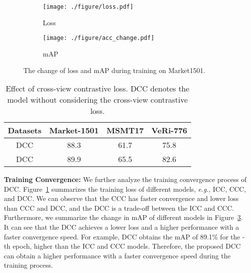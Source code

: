 \documentclass[10pt,twocolumn,letterpaper]{article}
\begin{document}
\begin{figure}
\centering
\begin{subfigure}{0.475\linewidth}
\texttt{[image: ./figure/loss.pdf]}
\caption{Loss}
\label{fig:loss}
\end{subfigure}
\begin{subfigure}{0.475\linewidth}
\texttt{[image: ./figure/acc\_change.pdf]}
\caption{mAP}
\label{fig:map}
\end{subfigure}
\caption{The change of loss and mAP during training on Market1501.}
\end{figure}

\begin{table}
\footnotesize
\begin{center}
\begin{tabular}{c|ccc}
\toprule
Datasets          & Market-1501& MSMT17 & VeRi-776\\
\midrule
DCC& 88.3 & 61.7 & 75.8\\
DCC &89.9&65.5&82.6\\ \bottomrule
\end{tabular}
\caption{\small Effect of cross-view contrastive loss. DCC denotes the model without considering the cross-view contrastive loss.}
\label{tab:effect_cvl}
\end{center}
\end{table}

\textbf{Training Convergence:}
We further analyze the training convergence process of DCC.
Figure~\ref{fig:loss} summarizes the training loss of different models, \emph{e.g.,} ICC, CCC, and DCC.
We can observe that the CCC has faster convergence and lower loss than CCC and DCC, and the DCC is a trade-off between the ICC and CCC. 
Furthermore, we summarize the change in mAP of different models in Figure~\ref{fig:map}.
It can see that the DCC achieves a lower loss and a higher performance with a faster convergence speed.
For example, DCC obtains the mAP of 89.1\% for the -th epoch, higher than the ICC and CCC models.
Therefore, the proposed DCC can obtain a higher performance with a faster convergence speed during the training process.
\end{document}
